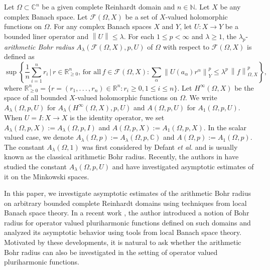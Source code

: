 \documentclass[a4paper,11pt, reqno]{amsart}
\theoremstyle{definition}
\newcounter {own}
\newcommand{\norm}[1]{\left\lVert#1\right\rVert}
\begin{document}
	 Let $\Omega \subset \mathbb{C}^n$ be a given complete Reinhardt domain and $n \in \mathbb{N}$. Let $X$ be any complex Banach space. Let $\mathcal{F}(\Omega, X)$ be a set of $X$-valued holomorphic functions on $\Omega$. For any complex Banach spaces $X$ and $Y$, let $U:X\rightarrow Y$ be a bounded liner operator and $\norm{U} \leq \lambda$. For each $1\leq p<\infty$ and $\lambda\geq 1$, the $\lambda_{p}$-\textit{arithmetic Bohr radius} $A_{\lambda}(\mathcal{F}(\Omega, X), p, U)$ of $\Omega$ with respect to $\mathcal{F}(\Omega, X)$ is defined as \begin{equation*}  \sup \left\{\frac{1}{n}\sum_{i=1}^{n}r_i \,|\, r\in \mathbb{R}^{n}_{\geq 0},\, \mbox{for all}\, f\in \mathcal{F}(\Omega, X) : \sum_{\alpha} \norm{U(a_{\alpha})r^\alpha}^p_{Y} \leq \lambda^p\,\norm{f}^p_{\Omega,X}\right\}, 
	\end{equation*}
	where $\mathbb{R}^n_{\geq 0}=\{r=(r_1,.\,.\,.\,, r_n) \in \mathbb{R}^n: r_i\geq 0, 1\leq i\leq n\}.$ Let $H^{\infty}(\Omega,X)$ be the space of all bounded $X$-valued holomorphic functions on $\Omega$. We write $A_\lambda(\Omega,p,U)$ for $A_{\lambda}(H^{\infty}(\Omega,X),p,U)$ and $A(\Omega,p,U)$ for $A_1(\Omega,p,U)$. When $U=I:X\rightarrow X$ is the identity operator, we set $A_{\lambda}(\Omega, p,X):=A_{\lambda}(\Omega, p,I)$ and $A(\Omega, p,X):=A_{1}(\Omega, p,X)$. In the scalar valued case, we denote $A_{\lambda}(\Omega, p):=A_{\lambda}(\Omega, p,\mathbb{C})$ and $A(\Omega,p):=A_1(\Omega,p)$. 
The constant $A_{\lambda}(\Omega,1)$ was first considered by Defant {\it et al.} \cite{defant-2007} and is usually known as the classical arithmetic Bohr radius. Recently, the authors in \cite{	A-H-P-banach,Allu-Pal-arithnmetic} have studied the constant $A_\lambda(\Omega,p,U)$ and have investigated asymptotic estimates of it on the Minkowski spaces. 
\vspace{1mm}

In this paper, we investigate asymptotic estimates of the arithmetic Bohr radius on arbitrary bounded complete Reinhardt domains using techniques from local Banach space theory. In a recent work \cite{Himadri-local-Banach-1}, the author introduced a notion of Bohr radius for operator valued pluriharmonic functions defined on such domains and analyzed its asymptotic behavior using tools from local Banach space theory. Motivated by these developments, it is natural to ask whether the arithmetic Bohr radius can also be investigated in the setting of operator valued pluriharmonic functions. 
\end{document}
